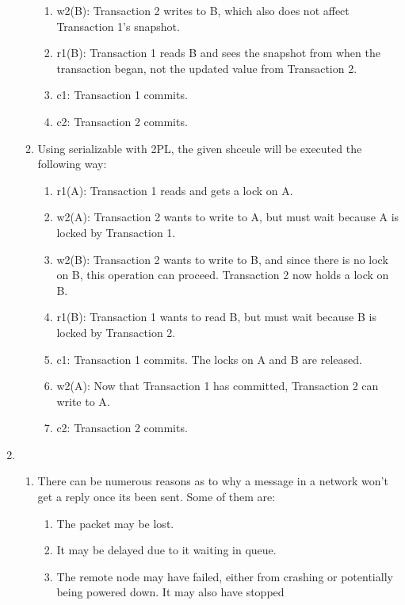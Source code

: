 \begin{enumerate}
\begin{enumerate}
\begin{enumerate}
                \item w2(B): Transaction 2 writes to B, which also does not affect Transaction 1's snapshot.
                \item r1(B): Transaction 1 reads B and sees the snapshot from when the transaction began, not the updated value from Transaction 2.
                \item c1: Transaction 1 commits.
                \item c2: Transaction 2 commits.
            \end{enumerate}
        \item Using serializable with 2PL, the given shceule will be executed
            the following way:
            \begin{enumerate}
                \item r1(A): Transaction 1 reads and gets a lock on A.
                \item w2(A): Transaction 2 wants to write to A, but must wait because A is locked by Transaction 1.
                \item w2(B): Transaction 2 wants to write to B, and since there is no lock on B, this operation can proceed. Transaction 2 now holds a lock on B.
                \item r1(B): Transaction 1 wants to read B, but must wait because B is locked by Transaction 2.
                \item c1: Transaction 1 commits. The locks on A and B are released.
                \item w2(A): Now that Transaction 1 has committed, Transaction 2 can write to A.
                \item c2: Transaction 2 commits.
            \end{enumerate}
    \end{enumerate}
    \item 
    \begin{enumerate}
        \item There can be numerous reasons as to why a message in a network 
            won't get a reply once its been sent. Some of them are:
            \begin{enumerate}
                \item The packet may be lost.
                \item It may be delayed due to it waiting in queue.
                \item The remote node may have failed, either from crashing or 
                    potentially being powered down. It may also have stopped 

\end{enumerate}
\end{enumerate}
\end{enumerate}
